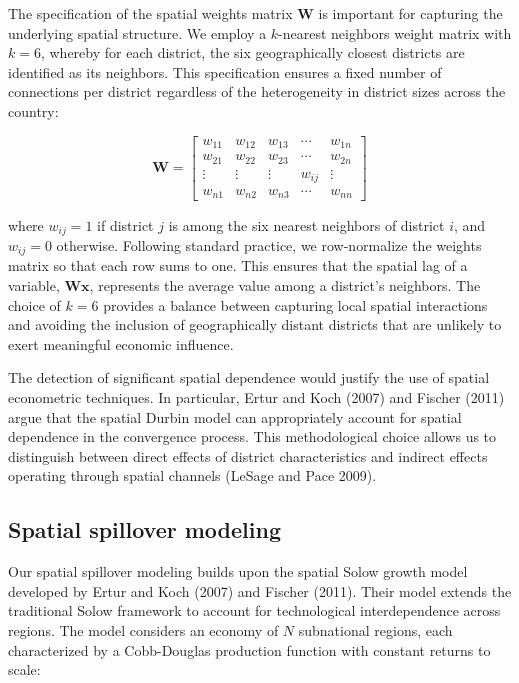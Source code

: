 \documentclass[
  letterpaper,
  DIV=11,
  numbers=noendperiod]{scrartcl}
\begin{document}
The specification of the spatial weights matrix \(\mathbf{W}\) is
important for capturing the underlying spatial structure. We employ a
\(k\)-nearest neighbors weight matrix with \(k = 6\), whereby for each
district, the six geographically closest districts are identified as its
neighbors. This specification ensures a fixed number of connections per
district regardless of the heterogeneity in district sizes across the
country:

\[
\mathbf{W}=\left[\begin{array}{ccccc}
w_{11} & w_{12} & w_{13} & \cdots & w_{1n} \\
w_{21} & w_{22} & w_{23} & \cdots & w_{2n} \\
\vdots & \vdots & \vdots & w_{ij} & \vdots \\
w_{n1} & w_{n2} & w_{n3} & \cdots & w_{nn}
\end{array}\right]
\]

where \(w_{ij} = 1\) if district \(j\) is among the six nearest
neighbors of district \(i\), and \(w_{ij} = 0\) otherwise. Following
standard practice, we row-normalize the weights matrix so that each row
sums to one. This ensures that the spatial lag of a variable,
\(\mathbf{W} \mathbf{x}\), represents the average value among a
district's neighbors. The choice of \(k = 6\) provides a balance between
capturing local spatial interactions and avoiding the inclusion of
geographically distant districts that are unlikely to exert meaningful
economic influence.

The detection of significant spatial dependence would justify the use of
spatial econometric techniques. In particular, Ertur and Koch (2007) and
Fischer (2011) argue that the spatial Durbin model can appropriately
account for spatial dependence in the convergence process. This
methodological choice allows us to distinguish between direct effects of
district characteristics and indirect effects operating through spatial
channels (LeSage and Pace 2009).

\subsection{Spatial spillover
modeling}\label{spatial-spillover-modeling}

Our spatial spillover modeling builds upon the spatial Solow growth
model developed by Ertur and Koch (2007) and Fischer (2011). Their model
extends the traditional Solow framework to account for technological
interdependence across regions. The model considers an economy of \(N\)
subnational regions, each characterized by a Cobb-Douglas production
function with constant returns to scale:
\end{document}
